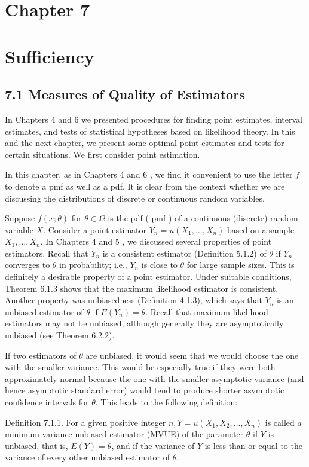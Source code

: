 \section*{Chapter 7}
\section*{Sufficiency}
\subsection*{7.1 Measures of Quality of Estimators}
In Chapters 4 and 6 we presented procedures for finding point estimates, interval estimates, and tests of statistical hypotheses based on likelihood theory. In this and the next chapter, we present some optimal point estimates and tests for certain situations. We first consider point estimation.

In this chapter, as in Chapters 4 and 6 , we find it convenient to use the letter $f$ to denote a pmf as well as a pdf. It is clear from the context whether we are discussing the distributions of discrete or continuous random variables.

Suppose $f(x ; \theta)$ for $\theta \in \Omega$ is the pdf ( pmf ) of a continuous (discrete) random variable $X$. Consider a point estimator $Y_{n}=u\left(X_{1}, \ldots, X_{n}\right)$ based on a sample $X_{1}, \ldots, X_{n}$. In Chapters 4 and 5 , we discussed several properties of point estimators. Recall that $Y_{n}$ is a consistent estimator (Definition 5.1.2) of $\theta$ if $Y_{n}$ converges to $\theta$ in probability; i.e., $Y_{n}$ is close to $\theta$ for large sample sizes. This is definitely a desirable property of a point estimator. Under suitable conditions, Theorem 6.1.3 shows that the maximum likelihood estimator is consistent. Another property was unbiasedness (Definition 4.1.3), which says that $Y_{n}$ is an unbiased estimator of $\theta$ if $E\left(Y_{n}\right)=\theta$. Recall that maximum likelihood estimators may not be unbiased, although generally they are asymptotically unbiased (see Theorem 6.2.2).

If two estimators of $\theta$ are unbiased, it would seem that we would choose the one with the smaller variance. This would be especially true if they were both approximately normal because the one with the smaller asymptotic variance (and hence asymptotic standard error) would tend to produce shorter asymptotic confidence intervals for $\theta$. This leads to the following definition:

Definition 7.1.1. For a given positive integer $n, Y=u\left(X_{1}, X_{2}, \ldots, X_{n}\right)$ is called $a$ minimum variance unbiased estimator (MVUE) of the parameter $\theta$ if $Y$ is unbiased, that is, $E(Y)=\theta$, and if the variance of $Y$ is less than or equal to the variance of every other unbiased estimator of $\theta$.


